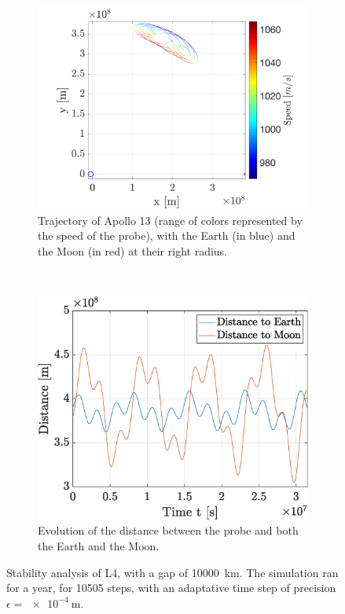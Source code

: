\documentclass[a4paper,12pt,twoside]{article}
\begin{document}
\begin{figure}[h]
  \centering
  \begin{subfigure}[t]{0.55\textwidth}
    \includegraphics[width=\textwidth]{graphs/ex6b_traj.png}
    \caption{Trajectory of Apollo 13 (range of colors represented by the speed of the probe), with the Earth (in blue) and the Moon (in red) at their right radius.}
    \label{fig:6b_traj}
  \end{subfigure}
  ~
  \begin{subfigure}[t]{0.4\textwidth}
    \includegraphics[width=\textwidth]{graphs/ex6b_dist.eps}
    \caption{Evolution of the distance between the probe and both the Earth and the Moon.}
    \label{fig:6b_dist}
  \end{subfigure}
  \caption{Stability analysis of L4, with a gap of \SI{10000}{\km}. The simulation ran for a year, for \num{10505} steps, with an adaptative time step of precision $\epsilon = \SI{e-4}{\m}$.}
  \label{fig:6b_stab}
\end{figure}
\end{document}
